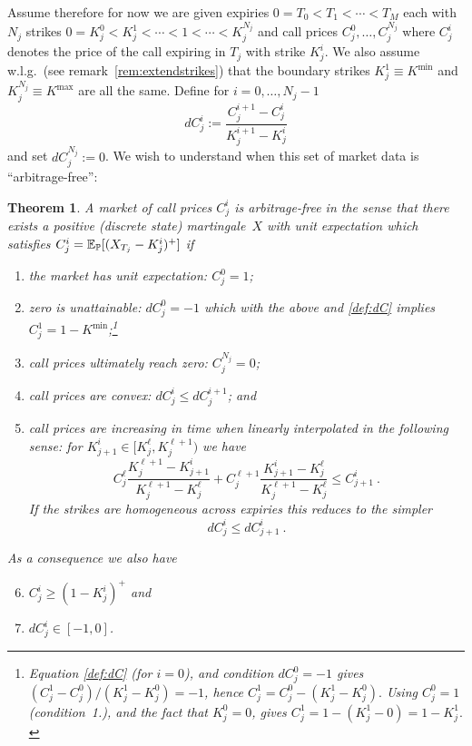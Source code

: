 \documentclass[twoside]{article}
\theoremstyle{plain}
\newtheorem{theorem}{Theorem}[section]        %
\theoremstyle{definition}
\theoremstyle{remark}
\begin{document}
Assume therefore for now we are given expiries $0=T_0<T_1<\cdots<T_M$ each with $N_j$ strikes
 $0=K^0_j<K^1_j<\cdots<1<\cdots<K^{N_j}_j$ and call prices $C^0_j,\ldots,C^{N_j}_j$
where $C_j^i$ denotes the price of the call expiring in $T_j$ with strike $K^i_j$. We also assume w.l.g.~(see remark~\ref{rem:extendstrikes}) that the boundary strikes $K^1_j\equiv K^{\min}$ and $K^{N_j}_j\equiv K^{\max}$ are
all the same.
Define for $i=0, \ldots, N_j-1$
\begin{equation}\label{def:dC}
    dC^i_j := \frac{ C^{i+1}_j - C_j^i }{ K^{i+1}_j - K^i_j }  
\end{equation}
and set $dC_j^{N_j}:=0$. We wish to understand when this set of market data is ``arbitrage-free'':
\begin{theorem}\label{th:noarb}
    A market of call prices $C_j^i$ is \emph{arbitrage-free} in the sense that 
    there exists a positive (discrete state) martingale~$X$ with unit expectation which satisfies
    $C^i_j=\mathbb{E}_{\mathbb{P}}[(X_{T_j}-K^i_j)^+]$
    if
    \begin{enumerate}
    		\item the market has unit expectation: $C_j^{0}=1$;
    		\item zero is unattainable: $dC_j^{0}=-1$ which with the above and \eqref{def:dC} implies $C^1_j=1-K^{\min}$;\footnote{
Equation \eqref{def:dC} (for $i=0$), and  condition $dC^0_j=-1$ gives
$
    (C^{1}_j - C^{0}_j)/(K^{1}_j-K_j^{0})=-1
$,
hence 
$C^{1}_j = C^{0}_j - (K_j^{1}-K_j^{0}).$
Using  $C^{0}_j=1$ (condition~1.), and the fact that $K_j^{0}=0$, gives
$C^{1}_j = 1 - (K_j^{1}-0)=1-K_j^{1}.$
}
        \item call prices ultimately reach zero: $C_j^{N_j}=0$;
        \item call prices are convex: $ dC^i_j \leq dC^{i+1}_j$; and\label{item:distimedc}
        \item call prices are increasing in time when linearly interpolated in the following sense:
          for $K^i_{j+1} \in [ K_j^\ell, K_j^{\ell+1})$ we have
          \begin{equation}\label{eq:arbfreeinT}              
                 C_j^\ell \frac{K_j^{\ell+1} - K_{j+1}^i}{K_j^{\ell+1} - K_j^\ell}
                 +
                 C_j^{\ell+1} \frac{K_{j+1}^i - K_j^{\ell} }{K_j^{\ell+1} - K_j^\ell}                 
                 \leq
                 C_{j+1}^i \ .
          \end{equation}
          If the strikes are homogeneous across expiries this reduces to
          the simpler
          $$
            dC^i_j \leq dC^i_{j+1} \ .
          $$
          

        
    \end{enumerate}
    As a consequence we also have
    \begin{enumerate}\setcounter{enumi}{5}
        \item $C_j^i \geq (1-K^i_j)^+$ and
        \item $dC_j^i\in [-1,0]$.
    \end{enumerate}
\end{theorem}
\end{document}
